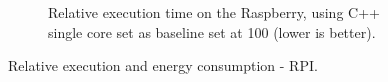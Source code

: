 \begin{figure}[]
\begin{subfigure}[t]{0.48\textwidth}
    \caption{Relative execution time on the Raspberry, using C++ single core set as baseline set at 100 (lower is better).}
    \label{fig:rpi-time-speedup}
  \end{subfigure}

  \caption{Relative execution and energy consumption - RPI.}
  \label{fig:rpi-relative-combined}
\end{figure}
